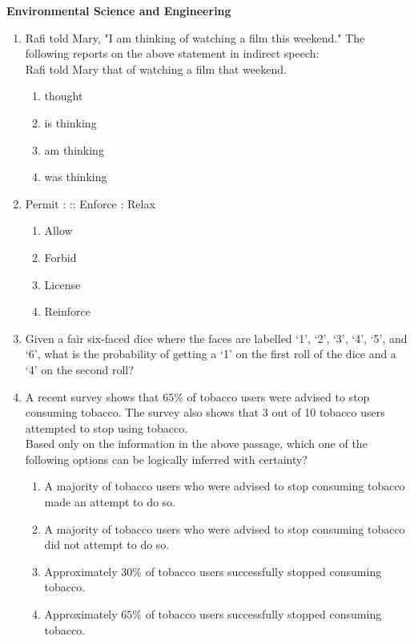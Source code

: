 \documentclass[journal,12pt,onecolumn]{IEEEtran}
\theoremstyle{remark}
\begin{document}
\centering
\textbf{Environmental Science and Engineering}
\begin{enumerate}
\item Rafi told Mary, "I am thinking of watching a film this weekend." 
The following reports on the above statement in indirect speech:\\ Rafi told Mary that 
\underline{\hspace{2cm}} of watching a film that weekend.
\begin{enumerate}
\item thought
\item is thinking
\item am thinking
\item was thinking
\end{enumerate}
\hfill{}
\item Permit : \underline{\hspace{2cm}} :: Enforce : Relax \\
\begin{enumerate}
\item Allow
\item Forbid
\item License
\item Reinforce
\end{enumerate}
\hfill{}
\item Given a fair six-faced dice where the faces are labelled `1', `2', `3', `4', `5', and `6', what is the probability of getting a `1' on the first roll of the dice and a `4' on the second roll?
\begin{enumerate}
\end{enumerate}
\hfill{}
\item A recent survey shows that $65\%$ of tobacco users were advised to stop consuming tobacco. 
The survey also shows that 3 out of 10 tobacco users attempted to stop using tobacco. \\
Based only on the information in the above passage, which one of the following options can be logically inferred with certainty?
\begin{enumerate}
\item A majority of tobacco users who were advised to stop consuming tobacco made an attempt to do so.
\item A majority of tobacco users who were advised to stop consuming tobacco did not attempt to do so.
\item Approximately $30\%$ of tobacco users successfully stopped consuming tobacco.
\item Approximately $65\%$ of tobacco users successfully stopped consuming tobacco.
\end{enumerate}
\hfill{}


\end{enumerate}
\end{document}
